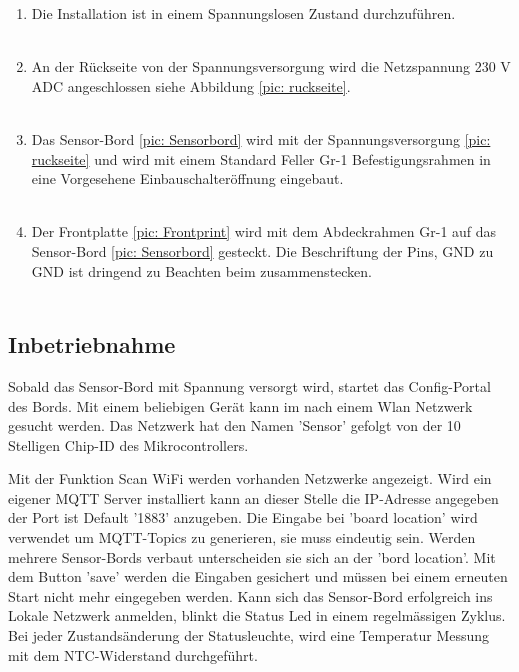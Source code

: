 \begin{enumerate}
	\item Die Installation ist in einem Spannungslosen Zustand durchzuführen.\\
	\\
	\item An der Rückseite von der Spannungsversorgung wird die Netzspannung 230 V ADC angeschlossen siehe Abbildung \ref{pic: ruckseite}.\\
	\\
	\item Das Sensor-Bord \ref{pic: Sensorbord} wird mit der Spannungsversorgung \ref{pic: ruckseite} und wird mit einem Standard Feller Gr-1 Befestigungsrahmen in eine Vorgesehene Einbauschalteröffnung eingebaut. \\
	\\
	\item Der Frontplatte \ref{pic: Frontprint} wird mit dem Abdeckrahmen Gr-1 auf das Sensor-Bord \ref{pic: Sensorbord} gesteckt. Die Beschriftung der Pins, GND zu GND ist dringend zu Beachten beim zusammenstecken.\\
	\\
	\end{enumerate}

\subsection{Inbetriebnahme}
Sobald das Sensor-Bord mit Spannung versorgt wird, startet das Config-Portal des Bords. Mit einem beliebigen Gerät kann im nach einem Wlan Netzwerk gesucht werden. Das Netzwerk hat den Namen 'Sensor' gefolgt von der 10 Stelligen Chip-ID des Mikrocontrollers. 

Mit der Funktion Scan WiFi werden vorhanden Netzwerke angezeigt. Wird ein eigener MQTT Server installiert kann an dieser Stelle die IP-Adresse angegeben der Port ist Default '1883' anzugeben. Die Eingabe bei 'board location' wird verwendet um MQTT-Topics zu generieren, sie muss eindeutig sein. Werden mehrere Sensor-Bords verbaut unterscheiden sie sich an der 'bord location'. Mit dem Button 'save' werden die Eingaben gesichert und müssen bei einem erneuten Start nicht mehr eingegeben werden. Kann sich das Sensor-Bord erfolgreich ins Lokale Netzwerk anmelden, blinkt die Status Led in einem regelmässigen Zyklus. Bei jeder Zustandsänderung der Statusleuchte, wird eine Temperatur Messung mit dem NTC-Widerstand durchgeführt. 

